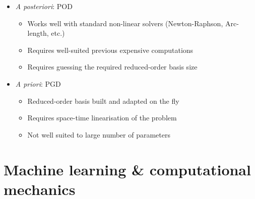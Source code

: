 \documentclass[aspectratio=1610, 10pt]{beamer}
\begin{document}
\begin{frame}
\begin{itemize}
\begin{itemize}
            \item \emph{A posteriori}: POD 
            \begin{itemize}
                \item[{\footnotesize \color{LGreenLMS} \faPlusSquare}] Works well with standard non-linear solvers (Newton-Raphson, Arc-length, etc.)
                \item[{\footnotesize \color{RougeLMS} \faMinusSquare}] Requires well-suited previous expensive computations
                \item[{\footnotesize \color{RougeLMS} \faMinusSquare}] Requires guessing the required reduced-order basis size
            \end{itemize}
            \item \emph{A priori}: PGD
            \begin{itemize}
                \item[{\footnotesize \color{LGreenLMS} \faPlusSquare}] Reduced-order basis built and adapted on the fly
                \item[{\footnotesize \color{RougeLMS} \faMinusSquare}] Requires space-time linearisation of the problem
                \item[{\footnotesize \color{RougeLMS} \faMinusSquare}] Not well suited to large number of parameters
            \end{itemize}
        \end{itemize}
    \end{itemize}
\end{frame}


\section{Machine learning \& computational mechanics}
\end{document}
